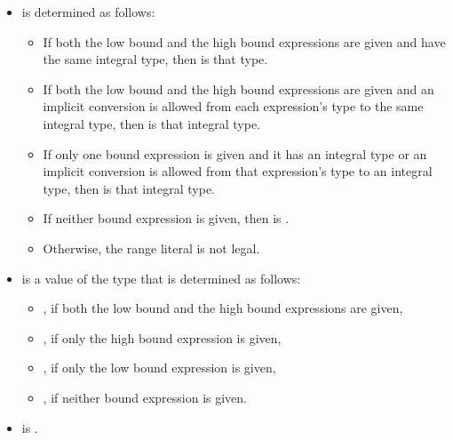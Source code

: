 \begin{itemize}

\item {} is determined as follows:
  \begin{itemize}

  \item If both the low bound and the high bound expressions are given
        and have the same integral type, then  is that type.

  \item If both the low bound and the high bound expressions are given
        and an implicit conversion is allowed from each expression's type
        to the same integral type, then  is that
        integral type.

  \item If only one bound expression is given and it has an integral type
        or an implicit conversion is allowed from that expression's type
        to an integral type, then  is that integral type.

  \item If neither bound expression is given, then  is
        .

  \item Otherwise, the range literal is not legal.
  \end{itemize}

\item {} is a value of the type 
that is determined as follows:
  \begin{itemize}

  \item {}, if both the low bound and the high bound expressions
         are given,

  \item {}, if only the high bound expression is given,

  \item {}, if only the low bound expression is given,

  \item {}, if neither bound expression is given.
  \end{itemize}

\item {} is .

\end{itemize}

